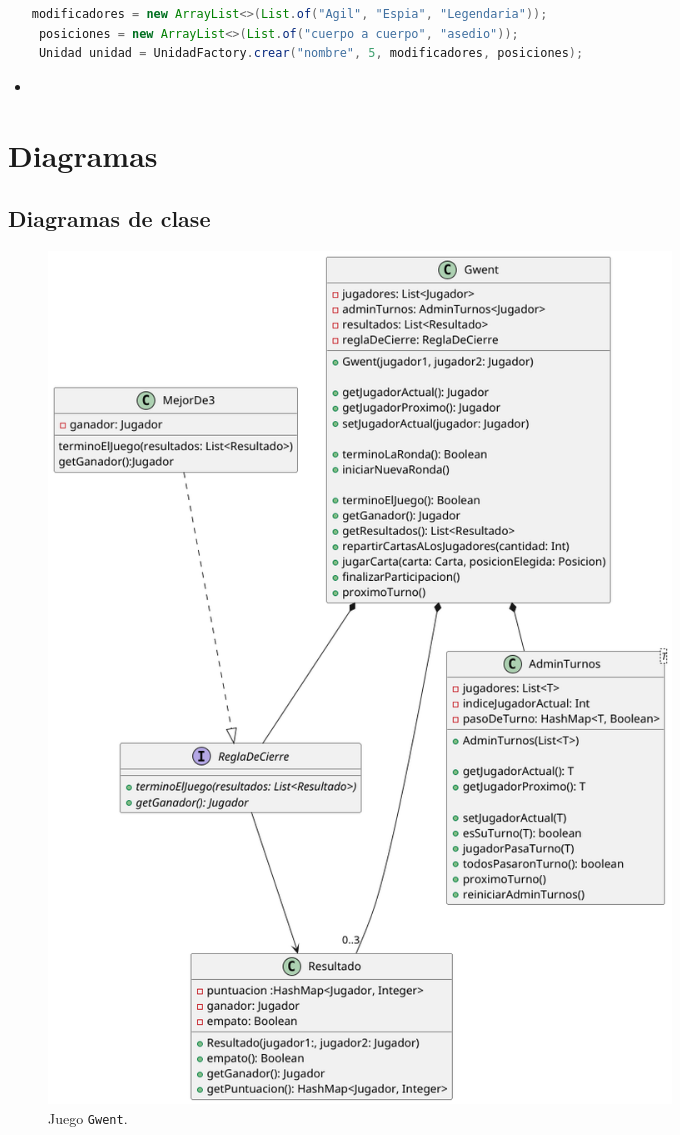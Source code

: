 \documentclass[titlepage,a4paper]{article}
\begin{document}
\begin{itemize}
		\begin{lstlisting}[language=Java, caption={Ejemplo de creación de unidad usando UnidadFactory}]
 modificadores = new ArrayList<>(List.of("Agil", "Espia", "Legendaria"));
 posiciones = new ArrayList<>(List.of("cuerpo a cuerpo", "asedio"));
 Unidad unidad = UnidadFactory.crear("nombre", 5, modificadores, posiciones);
		\end{lstlisting}

	\item \end{itemize}






	


	\section{Diagramas}\label{sec:diagramas}


	\subsection{Diagramas de clase}\label{sec:diagramasdeclase}
	\begin{figure}[H]
		\centering
		\includegraphics[width=0.8\textwidth]{diagramas/clases/Gwent}
		\caption{\label{fig:class01}Juego \texttt{Gwent}.}
	\end{figure}
\end{document}
